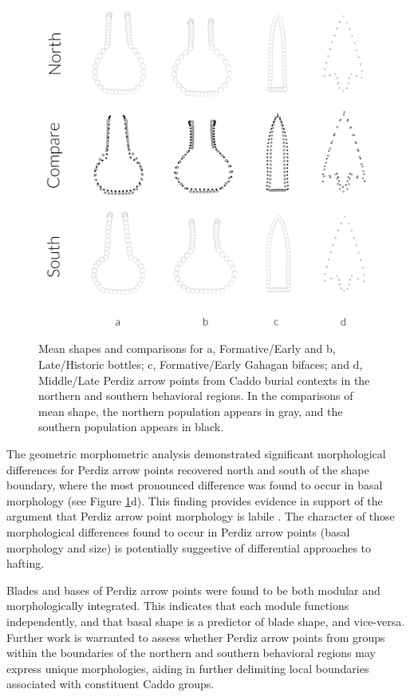 \documentclass[smallextended]{svjour3}       %
\begin{document}
\begin{figure}
\includegraphics[width=1\linewidth]{ms-figs/figure6} \caption{Mean shapes and comparisons for a, Formative/Early and b, Late/Historic bottles; c, Formative/Early Gahagan bifaces; and d, Middle/Late Perdiz arrow points from Caddo burial contexts in the northern and southern behavioral regions. In the comparisons of mean shape, the northern population appears in gray, and the southern population appears in black.}\label{fig:fig6}
\end{figure}

The geometric morphometric analysis demonstrated significant
morphological differences for Perdiz arrow points recovered north and
south of the shape boundary, where the most pronounced difference was
found to occur in basal morphology (see Figure \ref{fig:fig6}d). This
finding provides evidence in support of the argument that Perdiz arrow
point morphology is labile \cite{RN9364}. The character of those
morphological differences found to occur in Perdiz arrow points (basal
morphology and size) is potentially suggestive of differential
approaches to hafting.

Blades and bases of Perdiz arrow points were found to be both modular
and morphologically integrated. This indicates that each module
functions independently, and that basal shape is a predictor of blade
shape, and vice-versa. Further work is warranted to assess whether
Perdiz arrow points from groups within the boundaries of the northern
and southern behavioral regions may express unique morphologies, aiding
in further delimiting local boundaries associated with constituent Caddo
groups.
\end{document}
